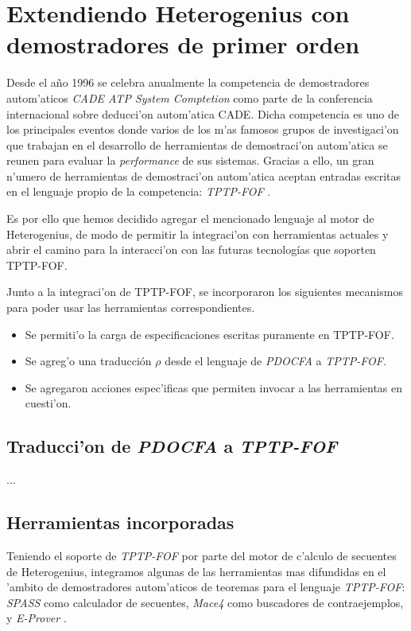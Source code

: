 \section{Extendiendo Heterogenius con demostradores de primer orden}

Desde el a\~no 1996 se celebra anualmente la competencia de demostradores autom'aticos \emph{CADE ATP System Comptetion} \cite{casc} como parte de la conferencia internacional sobre deducci'on autom'atica CADE.
Dicha competencia es uno de los principales eventos donde varios de los m'as famosos grupos de investigaci'on que trabajan en el desarrollo de herramientas de demostraci'on autom'atica se reunen para evaluar la \emph{performance} de sus sistemas.
Gracias a ello, un gran n'umero de herramientas de demostraci'on autom'atica aceptan entradas escritas en el lenguaje propio de la competencia: \textit{TPTP-FOF} \cite{fof}.

Es por ello que hemos decidido agregar el mencionado lenguaje al motor de Heterogenius, de modo de permitir la integraci'on con herramientas actuales y abrir el camino para la interacci'on con las futuras tecnologías que soporten TPTP-FOF.

Junto a la integraci'on de TPTP-FOF, se incorporaron los siguientes mecanismos para poder usar las herramientas correspondientes.

\begin{itemize}
\item Se permiti'o la carga de especificaciones escritas puramente en TPTP-FOF.

\item Se agreg'o una traducción $\rho$ desde el lenguaje de \textit{PDOCFA} a \textit{TPTP-FOF}. 

\item Se agregaron acciones espec'ificas que permiten invocar a las herramientas en cuesti'on.
\end{itemize}

\subsection{Traducci'on de \emph{PDOCFA} a \emph{TPTP-FOF}}

...

\subsection{Herramientas incorporadas}

Teniendo el soporte de \textit{TPTP-FOF} por parte del motor de c'alculo de secuentes de Heterogenius, integramos algunas de las herramientas mas difundidas en el 'ambito de demostradores autom'aticos de teoremas para el lenguaje \textit{TPTP-FOF}: \textit{SPASS} \cite{WDFKSW09} como calculador de secuentes, \textit{Mace4} \cite{m05} como buscadores de contraejemplos, y \textit{E-Prover} \cite{s13}. 

